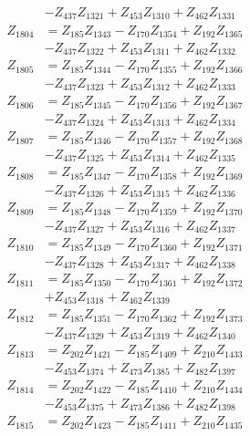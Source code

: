 \begin{multicols}{2}
\begin{align}
&- Z_{437}Z_{1321} + Z_{453}Z_{1310} + Z_{462}Z_{1331} \nonumber \\
Z_{1804} &= Z_{185}Z_{1343} - Z_{170}Z_{1354} + Z_{192}Z_{1365}  \nonumber \\
&- Z_{437}Z_{1322} + Z_{453}Z_{1311} + Z_{462}Z_{1332} \nonumber \\
Z_{1805} &= Z_{185}Z_{1344} - Z_{170}Z_{1355} + Z_{192}Z_{1366}  \nonumber \\
&- Z_{437}Z_{1323} + Z_{453}Z_{1312} + Z_{462}Z_{1333} \nonumber \\
Z_{1806} &= Z_{185}Z_{1345} - Z_{170}Z_{1356} + Z_{192}Z_{1367}  \nonumber \\
&- Z_{437}Z_{1324} + Z_{453}Z_{1313} + Z_{462}Z_{1334} \nonumber \\
Z_{1807} &= Z_{185}Z_{1346} - Z_{170}Z_{1357} + Z_{192}Z_{1368}  \nonumber \\
&- Z_{437}Z_{1325} + Z_{453}Z_{1314} + Z_{462}Z_{1335} \nonumber \\
Z_{1808} &= Z_{185}Z_{1347} - Z_{170}Z_{1358} + Z_{192}Z_{1369}  \nonumber \\
&- Z_{437}Z_{1326} + Z_{453}Z_{1315} + Z_{462}Z_{1336} \nonumber \\
Z_{1809} &= Z_{185}Z_{1348} - Z_{170}Z_{1359} + Z_{192}Z_{1370}  \nonumber \\
&- Z_{437}Z_{1327} + Z_{453}Z_{1316} + Z_{462}Z_{1337} \nonumber \\
Z_{1810} &= Z_{185}Z_{1349} - Z_{170}Z_{1360} + Z_{192}Z_{1371}  \nonumber \\
&- Z_{437}Z_{1328} + Z_{453}Z_{1317} + Z_{462}Z_{1338} \nonumber \\
Z_{1811} &= Z_{185}Z_{1350} - Z_{170}Z_{1361} + Z_{192}Z_{1372}  \nonumber \\
&+ Z_{453}Z_{1318} + Z_{462}Z_{1339} \nonumber \\
Z_{1812} &= Z_{185}Z_{1351} - Z_{170}Z_{1362} + Z_{192}Z_{1373}  \nonumber \\
&- Z_{437}Z_{1329} + Z_{453}Z_{1319} + Z_{462}Z_{1340} \nonumber \\
Z_{1813} &= Z_{202}Z_{1421} - Z_{185}Z_{1409} + Z_{210}Z_{1433}  \nonumber \\
&- Z_{453}Z_{1374} + Z_{473}Z_{1385} + Z_{482}Z_{1397} \nonumber \\
Z_{1814} &= Z_{202}Z_{1422} - Z_{185}Z_{1410} + Z_{210}Z_{1434}  \nonumber \\
&- Z_{453}Z_{1375} + Z_{473}Z_{1386} + Z_{482}Z_{1398} \nonumber \\
Z_{1815} &= Z_{202}Z_{1423} - Z_{185}Z_{1411} + Z_{210}Z_{1435}  \nonumber \\

\end{align}
\end{multicols}
